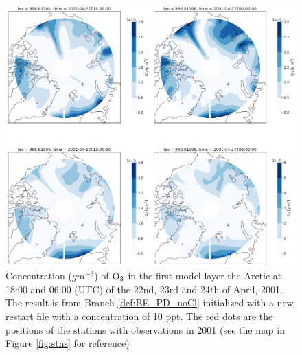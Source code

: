 \begin{figure}[h]
    \centering
    \includegraphics[width=\linewidth]{Chapter6_Results/images/polarO3_step4.png}
    \caption{Concentration ($g m^{-3}$) of $\mathrm{O_3}$ in the first model layer the Arctic at 18:00 and 06:00 (UTC) of the  22nd, 23rd and 24th of April, 2001. The result is from Branch \ref{def:BE_PD_noCl} initialized with a new restart file with a  concentration of 10 ppt. The red dots are the positions of the stations with observations in 2001 (see the map in Figure \ref{fig:stns} for reference)}
    \label{fig:polarO3_step4}
\end{figure}